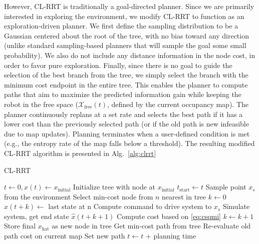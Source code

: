 However, CL-RRT is traditionally a goal-directed planner. Since we are primarily interested in exploring the environment, we modify CL-RRT to function as an exploration-driven planner. We first define the sampling distribution to be a Gaussian centered about the root of the tree, with no bias toward any direction (unlike standard sampling-based planners that will sample the goal some small probability). We also do not include any distance information in the node cost, in order to favor pure exploration. Finally, since there is no goal to guide the selection of the best branch from the tree, we simply select the branch with the minimum cost endpoint in the entire tree. This enables the planner to compute paths that aim to maximize the predicted information gain while keeping the robot in the free space ($\mathcal{X}_\text{free}(t)$, defined by the current occupancy map). The planner continuously replans at a set rate and selects the best path if it has a lower cost than the previously selected path (or if the old path is new infeasible due to map updates). Planning terminates when a user-defined condition is met (e.g., the entropy rate of the map falls below a threshold). The resulting modified CL-RRT algorithm is presented in Alg.~\ref{alg:clrrt}

\begin{algorithm} [t]
\caption{CL-RRT}
\label{alg:clrrt}
\begin{algorithmic}[1]
\State $t \gets 0, x(t) \gets x_\text{initial}$
\State Initialize tree with node at $x_\text{initial}$
\State $t_\text{start} \gets t$
\State Sample point $x_s$ from the environment
\State Select min-cost node from $n$ nearest in tree
\State $k \gets 0$
\State $\hat{x}(t+k) \gets $ last state at n
	\State Compute command to drive system to $x_s$
	\State Simulate system, get end state $\hat{x}(t+k+1)$
	\State Compute cost based on \eqref{eq:csqmi}
	\State $k \gets k+1$
\EndWhile
\State Store final $x_\text{hat}$ as new node in tree
\EndFor
\State Get min-cost path from tree
\State Re-evaluate old path cost on current map
\State Set new path
\EndIf
\State $t \gets t$ + planning time
\EndWhile
\end{algorithmic}
\end{algorithm}
